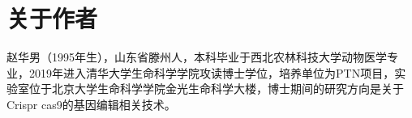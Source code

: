 \chapter*{关于作者}
赵华男（1995年生），山东省滕州人，本科毕业于西北农林科技大学动物医学专业，2019年进入清华大学生命科学学院攻读博士学位，培养单位为PTN项目，实验室位于北京大学生命科学学院金光生命科学大楼，博士期间的研究方向是关于Crispr cas9的基因编辑相关技术。

